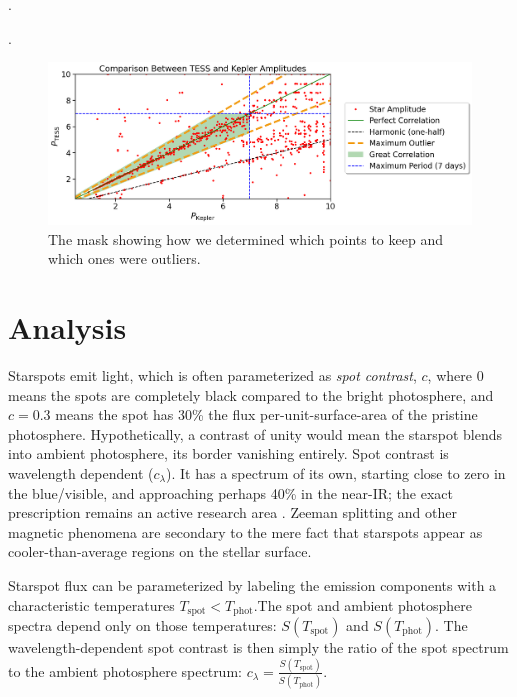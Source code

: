 \documentclass[modern]{aastex631}
\begin{document}
.

.

\begin{figure}[!htb]
  \centering
  \includegraphics[scale=0.5]{Amplitude Comparison Mask.png}
  \caption{The mask showing how we determined which points to keep and which ones were outliers.}
\end{figure}
\FloatBarrier

\section{Analysis}

Starspots emit light, which is often parameterized as \emph{spot contrast}, $c$, where $0$ means the spots are completely black compared to the bright photosphere, and $c=0.3$ means the spot has 30\% the flux per-unit-surface-area of the pristine photosphere.  Hypothetically, a contrast of unity would mean the starspot blends into ambient photosphere, its border vanishing entirely.  Spot contrast is wavelength dependent ($c_\lambda$). It has a spectrum of its own, starting close to zero in the blue/visible, and approaching perhaps 40\% in the near-IR; the exact prescription remains an active research area \cite{2005LRSP....2....8B}.  Zeeman splitting and other magnetic phenomena are secondary to the mere fact that starspots appear as cooler-than-average regions on the stellar surface.

Starspot flux can be parameterized by labeling the emission components with a characteristic temperatures
$T_\mathrm{spot}<T_\mathrm{phot}$.The spot and ambient photosphere spectra depend only on those temperatures: $S(T_\mathrm{spot})$ and $S(T_\mathrm{phot})$.  The wavelength-dependent spot contrast is then simply the ratio of the spot spectrum to the ambient photosphere spectrum:  $c_\lambda = \frac{S(T_\mathrm{spot})}{ S(T_\mathrm{phot})}$.
\end{document}
